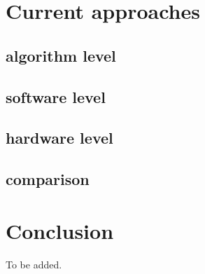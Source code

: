 \documentclass[article]{aaltoseries}
\begin{document}


\section{Current approaches}

\subsection{algorithm level}

\subsection{software level}

\subsection{hardware level}

\subsection{comparison}






\section{Conclusion}

To be added.






\end{document}
